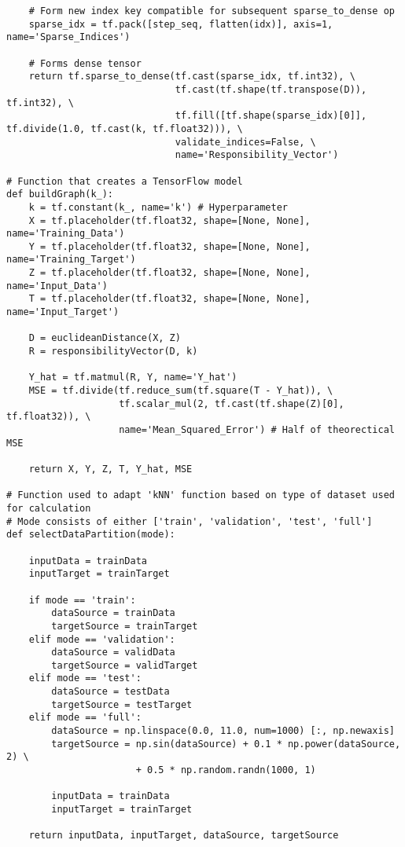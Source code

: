 \documentclass[a4paper,12pt]{article}
\begin{document}
\begin{verbatim}
    # Form new index key compatible for subsequent sparse_to_dense op
    sparse_idx = tf.pack([step_seq, flatten(idx)], axis=1, name='Sparse_Indices')
    
    # Forms dense tensor
    return tf.sparse_to_dense(tf.cast(sparse_idx, tf.int32), \
                              tf.cast(tf.shape(tf.transpose(D)), tf.int32), \
                              tf.fill([tf.shape(sparse_idx)[0]], tf.divide(1.0, tf.cast(k, tf.float32))), \
                              validate_indices=False, \
                              name='Responsibility_Vector')

# Function that creates a TensorFlow model
def buildGraph(k_):    
    k = tf.constant(k_, name='k') # Hyperparameter
    X = tf.placeholder(tf.float32, shape=[None, None], name='Training_Data')
    Y = tf.placeholder(tf.float32, shape=[None, None], name='Training_Target')
    Z = tf.placeholder(tf.float32, shape=[None, None], name='Input_Data')
    T = tf.placeholder(tf.float32, shape=[None, None], name='Input_Target')
    
    D = euclideanDistance(X, Z)
    R = responsibilityVector(D, k)
    
    Y_hat = tf.matmul(R, Y, name='Y_hat')
    MSE = tf.divide(tf.reduce_sum(tf.square(T - Y_hat)), \
                    tf.scalar_mul(2, tf.cast(tf.shape(Z)[0], tf.float32)), \
                    name='Mean_Squared_Error') # Half of theorectical MSE
    
    return X, Y, Z, T, Y_hat, MSE

# Function used to adapt 'kNN' function based on type of dataset used for calculation
# Mode consists of either ['train', 'validation', 'test', 'full']
def selectDataPartition(mode):
    
    inputData = trainData
    inputTarget = trainTarget
    
    if mode == 'train':
        dataSource = trainData
        targetSource = trainTarget
    elif mode == 'validation':
        dataSource = validData
        targetSource = validTarget
    elif mode == 'test':
        dataSource = testData
        targetSource = testTarget
    elif mode == 'full':
        dataSource = np.linspace(0.0, 11.0, num=1000) [:, np.newaxis]
        targetSource = np.sin(dataSource) + 0.1 * np.power(dataSource, 2) \
                       + 0.5 * np.random.randn(1000, 1)
        
        inputData = trainData
        inputTarget = trainTarget
        
    return inputData, inputTarget, dataSource, targetSource
    

\end{verbatim}
\end{document}
